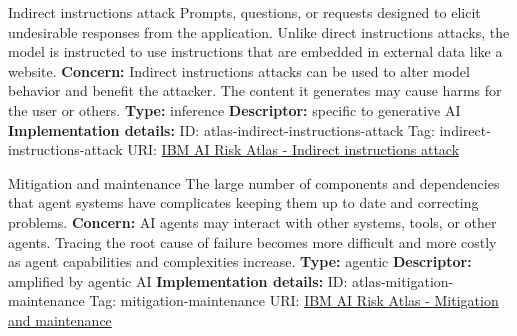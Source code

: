 \begin{definitionbox}{Indirect instructions attack}
Prompts, questions, or requests designed to elicit undesirable responses from the application. Unlike direct instructions attacks, the model is instructed to use instructions that are embedded in external data like a website.\newline\newline
\textbf{Concern: }Indirect instructions attacks can be used to alter model behavior and benefit the attacker. The content it generates may cause harms for the user or others.\newline\newline
\textbf{Type: }inference\newline
\textbf{Descriptor: }specific to generative AI \newline\newline
\textbf{Implementation details: } \newline
ID: atlas-indirect-instructions-attack \newline
Tag: indirect-instructions-attack \newline
URI:  \href{https://www.ibm.com/docs/en/watsonx/saas?topic=SSYOK8/wsj/ai-risk-atlas/indirect-instructions-attack.html}{IBM AI Risk Atlas - Indirect instructions attack}\newline
\end{definitionbox}
\begin{definitionbox}{Mitigation and maintenance}
The large number of components and dependencies that agent systems have complicates keeping them up to date and correcting problems.\newline\newline
\textbf{Concern: }AI agents may interact with other systems, tools, or other agents. Tracing the root cause of failure becomes more difficult and more costly as agent capabilities and complexities increase.\newline\newline
\textbf{Type: }agentic\newline
\textbf{Descriptor: }amplified by agentic AI \newline\newline
\textbf{Implementation details: } \newline
ID: atlas-mitigation-maintenance \newline
Tag: mitigation-maintenance \newline
URI:  \href{https://www.ibm.com/docs/en/watsonx/saas?topic=SSYOK8/wsj/ai-risk-atlas/mitigation-maintenance.html}{IBM AI Risk Atlas - Mitigation and maintenance}\newline
\end{definitionbox}
